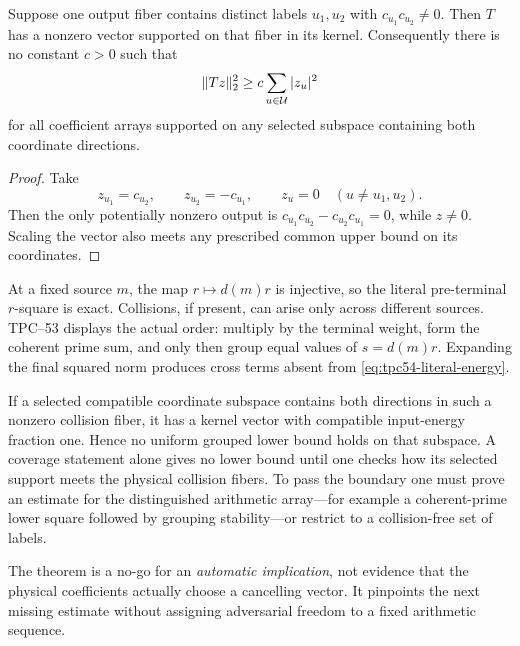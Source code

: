 \begin{theorem}
\label{thm:tpc54-two-atom-kernel}
Suppose one output fiber contains distinct labels \(u_1,u_2\) with
\(c_{u_1}c_{u_2}\ne0\).  Then \(T\) has a nonzero vector supported on
that fiber in its kernel.  Consequently there is no constant \(c>0\)
such that
\begin{equation}
 \|Tz\|_2^2\ge c\sum_{u\in\mathcal U}|z_u|^2
 \label{eq:tpc54-impossible-lower}
\end{equation}
for all coefficient arrays supported on any selected subspace containing
both coordinate directions.
\end{theorem}

\begin{proof}
Take
\[
 z_{u_1}=c_{u_2},\qquad z_{u_2}=-c_{u_1},
 \qquad z_u=0\quad(u\ne u_1,u_2).
\]
Then the only potentially nonzero output is
\(c_{u_1}c_{u_2}-c_{u_2}c_{u_1}=0\), while \(z\ne0\).  Scaling the vector
also meets any prescribed common upper bound on its coordinates.
\end{proof}

At a fixed source \(m\), the map \(r\mapsto d(m)r\) is injective, so the
literal pre-terminal \(r\)-square is exact.  Collisions, if present, can
arise only across different sources.  TPC--53 displays the actual order:
multiply by the
terminal weight, form the coherent prime sum, and only then group equal
values of \(s=d(m)r\).  Expanding the final squared norm produces cross
terms absent from \eqref{eq:tpc54-literal-energy}.

\begin{corollary}
\label{cor:tpc54-selection-boundary}
If a selected compatible coordinate subspace contains both directions in
such a nonzero collision fiber, it has a kernel vector with compatible
input-energy fraction one.  Hence no uniform grouped lower bound holds on
that subspace.  A coverage statement alone gives no lower bound until one
checks how its selected support meets the physical collision fibers.  To
pass the boundary one must prove an estimate for the distinguished
arithmetic array---for example a coherent-prime lower square followed by
grouping stability---or restrict to a collision-free set of labels.
\end{corollary}

The theorem is a no-go for an \emph{automatic implication}, not evidence
that the physical coefficients actually choose a cancelling vector.  It
pinpoints the next missing estimate without assigning adversarial freedom
to a fixed arithmetic sequence.
